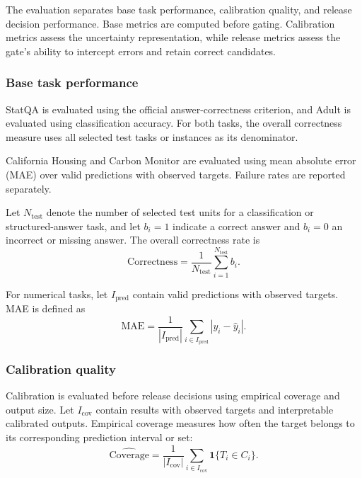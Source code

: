 \documentclass[preprint,12pt,authoryear]{elsarticle}
\begin{document}
The evaluation separates base task performance, calibration
quality, and release decision performance. Base metrics are
computed before gating. Calibration metrics assess the
uncertainty representation, while release metrics assess the
gate's ability to intercept errors and retain correct candidates.

\subsubsection{Base task performance}
\label{sec:base_task_performance}

StatQA is evaluated using the official answer-correctness criterion, and Adult is evaluated using classification accuracy. For both tasks, the overall correctness measure uses all selected test tasks or instances as its denominator.

California Housing and Carbon Monitor are evaluated using mean absolute error (MAE) over valid predictions with observed targets. Failure rates are reported separately.

Let \(N_{\mathrm{test}}\) denote the number of selected test units for a classification or structured-answer task, and let \(b_i=1\) indicate a correct answer and \(b_i=0\) an incorrect or missing answer. The overall correctness rate is
\begin{equation}
    \mathrm{Correctness}
    =
    \frac{1}{N_{\mathrm{test}}}
    \sum_{i=1}^{N_{\mathrm{test}}} b_i.
    \label{eq:exp_correctness}
\end{equation}

For numerical tasks, let \(I_{\mathrm{pred}}\) contain valid
predictions with observed targets. MAE is defined as
\begin{equation}
    \mathrm{MAE}
    =
    \frac{1}{|I_{\mathrm{pred}}|}
    \sum_{i\in I_{\mathrm{pred}}}
    \left|y_i-\hat{y}_i\right|.
    \label{eq:exp_mae}
\end{equation}

\subsubsection{Calibration quality}
\label{sec:exp_calibration_quality}

Calibration is evaluated before release decisions using empirical coverage and output size. Let \(I_{\mathrm{cov}}\) contain results with observed targets and interpretable calibrated outputs. Empirical coverage measures how often the target belongs to its corresponding prediction interval or set:
\begin{equation}
    \widehat{\mathrm{Coverage}}
    =
    \frac{1}{|I_{\mathrm{cov}}|}
    \sum_{i\in I_{\mathrm{cov}}}
    \mathbf{1}\{T_i\in C_i\}.
    \label{eq:exp_coverage}
\end{equation}
\end{document}

